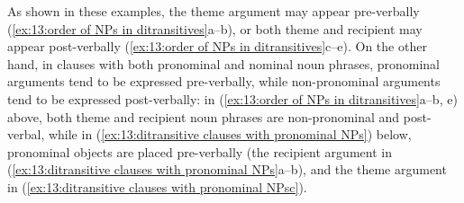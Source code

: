     \z
\z

As shown in these examples, the theme argument may appear pre-verbally (\ref{ex:13:order of NPs in ditransitives}a--b), or both theme and recipient may appear post-verbally (\ref{ex:13:order of NPs in ditransitives}c--e). On the other hand, in clauses with both pronominal and nominal noun phrases, pronominal arguments tend to be expressed pre-verbally, while non-pronominal arguments tend to be expressed post-verbally: in (\ref{ex:13:order of NPs in ditransitives}a--b, e) above, both theme and recipient noun phrases are non-pronominal and post-verbal, while in (\ref{ex:13:ditransitive clauses with pronominal NPs}) below, pronominal objects are placed pre-verbally (the recipient argument in (\ref{ex:13:ditransitive clauses with pronominal NPs}a--b), and the theme argument in (\ref{ex:13:ditransitive clauses with pronominal NPsc}).

